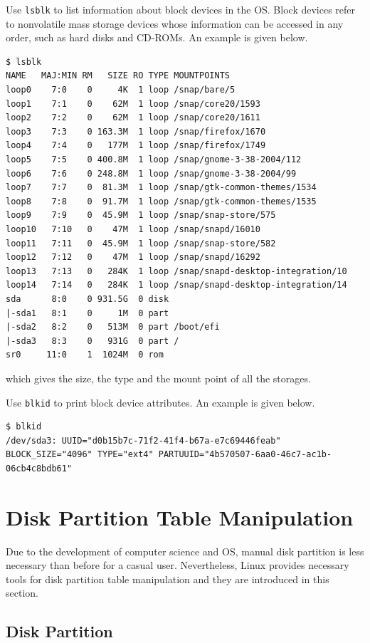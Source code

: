 Use \verb|lsblk| to list information about block devices in the OS. Block devices refer to nonvolatile mass storage devices whose information can be accessed in any order, such as hard disks and CD-ROMs. An example is given below.
\begin{lstlisting}
$ lsblk
NAME   MAJ:MIN RM   SIZE RO TYPE MOUNTPOINTS
loop0    7:0    0     4K  1 loop /snap/bare/5
loop1    7:1    0    62M  1 loop /snap/core20/1593
loop2    7:2    0    62M  1 loop /snap/core20/1611
loop3    7:3    0 163.3M  1 loop /snap/firefox/1670
loop4    7:4    0   177M  1 loop /snap/firefox/1749
loop5    7:5    0 400.8M  1 loop /snap/gnome-3-38-2004/112
loop6    7:6    0 248.8M  1 loop /snap/gnome-3-38-2004/99
loop7    7:7    0  81.3M  1 loop /snap/gtk-common-themes/1534
loop8    7:8    0  91.7M  1 loop /snap/gtk-common-themes/1535
loop9    7:9    0  45.9M  1 loop /snap/snap-store/575
loop10   7:10   0    47M  1 loop /snap/snapd/16010
loop11   7:11   0  45.9M  1 loop /snap/snap-store/582
loop12   7:12   0    47M  1 loop /snap/snapd/16292
loop13   7:13   0   284K  1 loop /snap/snapd-desktop-integration/10
loop14   7:14   0   284K  1 loop /snap/snapd-desktop-integration/14
sda      8:0    0 931.5G  0 disk
|-sda1   8:1    0     1M  0 part
|-sda2   8:2    0   513M  0 part /boot/efi
|-sda3   8:3    0   931G  0 part /
sr0     11:0    1  1024M  0 rom
\end{lstlisting}
which gives the size, the type and the mount point of all the storages.

Use \verb|blkid| to print block device attributes. An example is given below.
\begin{lstlisting}
$ blkid
/dev/sda3: UUID="d0b15b7c-71f2-41f4-b67a-e7c69446feab" BLOCK_SIZE="4096" TYPE="ext4" PARTUUID="4b570507-6aa0-46c7-ac1b-06cb4c8bdb61"
\end{lstlisting}

\section{Disk Partition Table Manipulation}

Due to the development of computer science and OS, manual disk partition is less necessary than before for a casual user. Nevertheless, Linux provides necessary tools for disk partition table manipulation and they are introduced in this section.

\subsection{Disk Partition}

